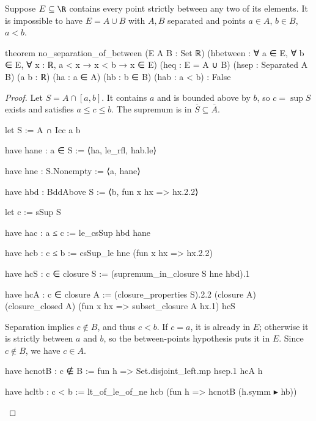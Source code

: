\begin{lemma}
  \label{ma:lem:no-separation-of-between}
  Suppose $E\subseteq\R$ contains every point strictly between any two of its elements.
  It is impossible to have $E=A\cup B$ with $A,B$ separated and points $a\in A$, $b\in B$, $a<b$.

  \begin{lean}
    theorem no_separation_of_between (E A B : Set ℝ)
        (hbetween : ∀ a ∈ E, ∀ b ∈ E, ∀ x : ℝ, a < x → x < b → x ∈ E)
        (heq : E = A ∪ B) (hsep : Separated A B)
        (a b : ℝ) (ha : a ∈ A) (hb : b ∈ B) (hab : a < b) : False
  \end{lean}
\end{lemma}

\begin{proof}
  Let $S=A\cap[a,b]$.
  It contains $a$ and is bounded above by $b$, so $c=\sup S$ exists and satisfies $a\leq c\leq b$.
  The supremum is in $\overline S\subseteq\overline A$.

  \begin{lean}
    let S := A ∩ Icc a b

    have hane : a ∈ S := ⟨ha, le_rfl, hab.le⟩

    have hne : S.Nonempty := ⟨a, hane⟩

    have hbd : BddAbove S := ⟨b, fun x hx => hx.2.2⟩

    let c := sSup S

    have hac : a ≤ c := le_csSup hbd hane

    have hcb : c ≤ b := csSup_le hne (fun x hx => hx.2.2)

    have hcS : c ∈ closure S := (supremum_in_closure S hne hbd).1

    have hcA : c ∈ closure A := (closure_properties S).2.2 (closure A)
      (closure_closed A) (fun x hx => subset_closure A hx.1) hcS
  \end{lean}

  Separation implies $c\notin B$, and thus $c<b$.
  If $c=a$, it is already in $E$; otherwise it is strictly between $a$ and $b$, so the
  between-points hypothesis puts it in $E$.
  Since $c\notin B$, we have $c\in A$.

  \begin{lean}
    have hcnotB : c ∉ B := fun h => Set.disjoint_left.mp hsep.1 hcA h

    have hcltb : c < b := lt_of_le_of_ne hcb (fun h => hcnotB (h.symm ▸ hb))


\end{lean}
\end{proof}
